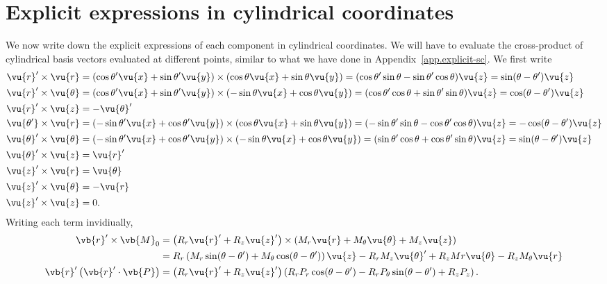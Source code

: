\documentclass[11pt,SymmetricalJury]{inrsthesis/inrsthesis}
\begin{document}
\section{Explicit expressions in cylindrical coordinates}

We now write down the explicit expressions of each component in cylindrical
coordinates. We will have to evaluate the cross-product of cylindrical
basis vectors evaluated at different points, similar to what we have done in
Appendix~\ref{app.explicit-sc}. We first write
  \begin{subequations}
  \begin{align}
    \vu{r}'\times\vu{r}           &= (\cos\theta'\vu{x}+\sin\theta'\vu{y})\times(\cos\theta\vu{x}+\sin\theta\vu{y})
                                   = (\cos\theta'\sin\theta-\sin\theta'\cos\theta)\vu{z}
                                   = \sin(\theta-\theta')\vu{z} \\
    \vu{r}'\times\vu{\theta}      &= (\cos\theta'\vu{x}+\sin\theta'\vu{y})\times(-\sin\theta\vu{x}+\cos\theta\vu{y})
                                   = (\cos\theta'\cos\theta+\sin\theta'\sin\theta)\vu{z}
                                   = \cos(\theta-\theta')\vu{z}\\
    \vu{r}'\times\vu{z}           &= -\vu{\theta}' \\
    \vu{\theta'}\times\vu{r}       &= (-\sin\theta'\vu{x}+\cos\theta'\vu{y})\times(\cos\theta\vu{x}+\sin\theta\vu{y})
                                   = (-\sin\theta'\sin\theta-\cos\theta'\cos\theta)\vu{z}
                                   = -\cos(\theta-\theta')\vu{z} \\
    \vu{\theta}'\times\vu{\theta} &= (-\sin\theta'\vu{x}+\cos\theta'\vu{y})\times(-\sin\theta\vu{x}+\cos\theta\vu{y})
                                   = (\sin\theta'\cos\theta+\cos\theta'\sin\theta)\vu{z}
                                   = \sin(\theta-\theta')\vu{z}\\
    \vu{\theta}'\times\vu{z}      &= \vu{r}' \\
    \vu{z}'\times\vu{r}           &= \vu{\theta} \\
    \vu{z}'\times\vu{\theta}      &= -\vu{r} \\
    \vu{z}'\times\vu{z}           &= 0.
  \end{align}
  \end{subequations}
Writing each term invidiually,
  \begin{subequations}
  \begin{align}
    \vb{r}'\times\vb{M}_0 &= \left(R_r\vu{r}'+R_z\vu{z}'\right)\times\left(M_r\vu{r}+M_\theta\vu{\theta}+M_z\vu{z}\right) \\
                          &= R_r\left(M_r\sin(\theta-\theta')+M_\theta\cos(\theta-\theta')\right)\vu{z}
                            -R_rM_z\vu{\theta}' + R_zMr\vu{\theta} -R_zM_\theta \vu{r} \\
    \vb{r}'\left(\vb{r}'\cdot\vb{P}\right) &=\left(R_r \vu{r}' + R_z \vu{z}'\right)
                                        \left(R_rP_r\cos(\theta-\theta')-R_rP_\theta\sin(\theta-\theta')+R_zP_z\right).
  \end{align}
  \end{subequations}
\end{document}
